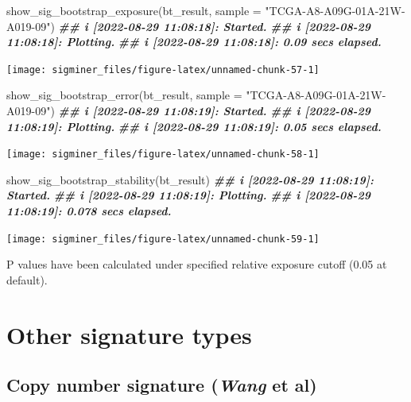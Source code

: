 \documentclass[
  12pt,
  a4paper,
  twoside]{book}
\newenvironment{Shaded}{\begin{snugshade}}{\end{snugshade}}
\newcommand{\AttributeTok}[1]{\textcolor[rgb]{0.77,0.63,0.00}{#1}}
\newcommand{\DocumentationTok}[1]{\textcolor[rgb]{0.56,0.35,0.01}{\textbf{\textit{#1}}}}
\newcommand{\FunctionTok}[1]{\textcolor[rgb]{0.00,0.00,0.00}{#1}}
\newcommand{\NormalTok}[1]{#1}
\newcommand{\StringTok}[1]{\textcolor[rgb]{0.31,0.60,0.02}{#1}}
\begin{document}
\begin{Shaded}
\begin{Highlighting}[]
\FunctionTok{show\_sig\_bootstrap\_exposure}\NormalTok{(bt\_result, }\AttributeTok{sample =} \StringTok{"TCGA{-}A8{-}A09G{-}01A{-}21W{-}A019{-}09"}\NormalTok{)}
\DocumentationTok{\#\# i [2022{-}08{-}29 11:08:18]: Started.}
\DocumentationTok{\#\# i [2022{-}08{-}29 11:08:18]: Plotting.}
\DocumentationTok{\#\# i [2022{-}08{-}29 11:08:18]: 0.09 secs elapsed.}
\end{Highlighting}
\end{Shaded}

\texttt{[image: sigminer\_files/figure-latex/unnamed-chunk-57-1]}

\begin{Shaded}
\begin{Highlighting}[]
\FunctionTok{show\_sig\_bootstrap\_error}\NormalTok{(bt\_result, }\AttributeTok{sample =} \StringTok{"TCGA{-}A8{-}A09G{-}01A{-}21W{-}A019{-}09"}\NormalTok{)}
\DocumentationTok{\#\# i [2022{-}08{-}29 11:08:19]: Started.}
\DocumentationTok{\#\# i [2022{-}08{-}29 11:08:19]: Plotting.}
\DocumentationTok{\#\# i [2022{-}08{-}29 11:08:19]: 0.05 secs elapsed.}
\end{Highlighting}
\end{Shaded}

\texttt{[image: sigminer\_files/figure-latex/unnamed-chunk-58-1]}

\begin{Shaded}
\begin{Highlighting}[]
\FunctionTok{show\_sig\_bootstrap\_stability}\NormalTok{(bt\_result)}
\DocumentationTok{\#\# i [2022{-}08{-}29 11:08:19]: Started.}
\DocumentationTok{\#\# i [2022{-}08{-}29 11:08:19]: Plotting.}
\DocumentationTok{\#\# i [2022{-}08{-}29 11:08:19]: 0.078 secs elapsed.}
\end{Highlighting}
\end{Shaded}

\texttt{[image: sigminer\_files/figure-latex/unnamed-chunk-59-1]}

P values have been calculated under specified relative exposure cutoff (0.05 at default).

\hypertarget{analysis-supps}{%
\chapter{Other signature types}\label{analysis-supps}}

\hypertarget{copy-number-signature-wang-et-al}{%
\section{\texorpdfstring{Copy number signature (\emph{Wang} et al)}{Copy number signature (Wang et al)}}\label{copy-number-signature-wang-et-al}}
\end{document}
